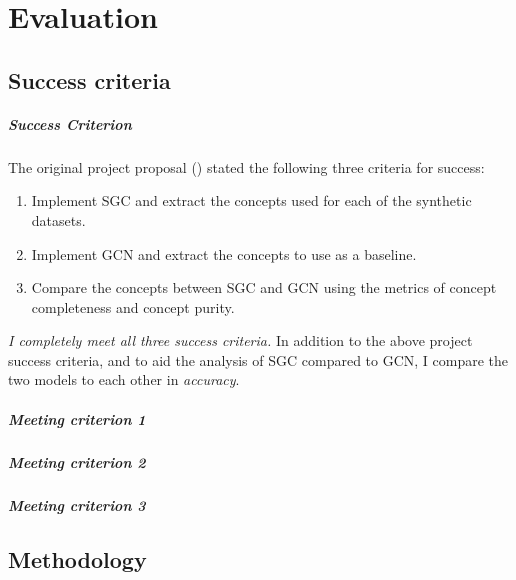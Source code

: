 \chapter{Evaluation}

\section{Success criteria}

\paragraph{Success Criterion}
The original project proposal () stated the following three criteria for success:
\begin{enumerate}
    \item 
        Implement SGC and extract the concepts used for each of the synthetic datasets.
        \label{crit1}
    \item 
        Implement GCN and extract the concepts to use as a baseline.
        \label{crit2}
    \item 
        Compare the concepts between SGC and GCN using the metrics of concept completeness and concept purity.
        \label{crit3}
\end{enumerate}

\emph{I completely meet all three success criteria.}
In addition to the above project success criteria, and to aid the analysis of SGC compared to GCN, 
I compare the two models to each other in \emph{accuracy}.

\paragraph{Meeting criterion 1}

\paragraph{Meeting criterion 2}

\paragraph{Meeting criterion 3}

\section{Methodology}

